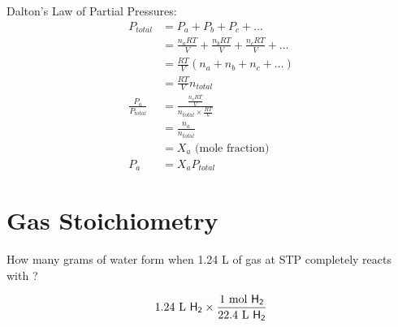 \documentclass[
	chapter=5,
	title={Gases},
	showanswers=true,
]{chem122notes}
\begin{document}
Dalton's Law of Partial Pressures:
\begin{equation}
	\begin{aligned}
		P_{total} &= P_{a} + P_{b} + P_{c} + \dots\\
				  &= \frac{n_{a}RT}{V} + \frac{n_{b}RT}{V} + \frac{n_{c}RT}{V} + \dots\\
				  &= \frac{RT}{V}\left( n_{a} + n_{b} + n_{c} + \dots \right)\\
				  &= \frac{RT}{V}n_{total}\\
		\frac{P_{a}}{P_{total}} &= \frac{\frac{n_{a}RT}{V}}{n_{total} \times \frac{RT}{V}}\\
								&= \frac{n_{a}}{n_{total}}\\
								&= X_{a} \mbox{  (mole fraction)}\\
		P_{a} &= X_{a}P_{total}
	\end{aligned}
	\label{eq:daltons-law}
\end{equation}

\section{Gas Stoichiometry}\label{sec:gas-stoichiometry}
How many grams of water form when 1.24 L of  gas at STP completely reacts with ?
\begin{answer}
	\begin{equation*}
	\begin{aligned}
		1.24 \mbox{ L } \ce{H2} \times \frac{1 \mbox{ mol } \ce{H2}}{22.4 \mbox{ L } \ce{H2}}
	\end{aligned}
	\end{equation*}
\end{answer}
\end{document}
